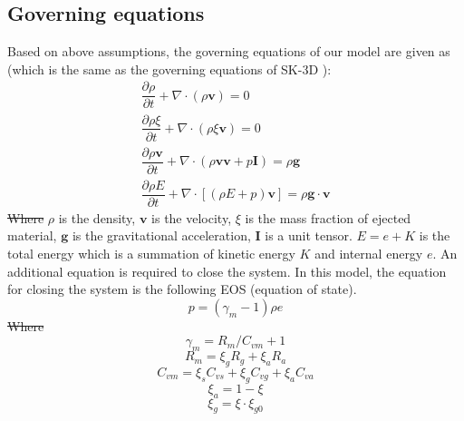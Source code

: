 \documentclass[gmd, manuscript]{copernicus} %
\providecommand{\DIFadd}[1]{{\protect\color{blue}\uwave{#1}}} %
\providecommand{\DIFdel}[1]{{\protect\color{red}\sout{#1}}}                      %
\providecommand{\DIFaddbegin}{} %
\providecommand{\DIFaddend}{} %
\providecommand{\DIFdelbegin}{} %
\providecommand{\DIFdelend}{} %
\begin{document}
\subsection{Governing equations}
Based on above assumptions, the governing equations of our model are given as (which is the same as the governing equations of SK-3D \citep{suzuki2005numerical}):
\begin{align}
\dfrac{\partial \rho}{\partial t} + \nabla \cdot \left(\rho \textbf{v}\right) = 0 \label{eq:gov-cs-rho} \\
\dfrac{\partial \rho \xi}{\partial t} + \nabla \cdot \left(\rho \xi \textbf{v}\right) = 0 \label{eq:gov-cs-ks}\\
\dfrac{\partial \rho \textbf{v}}{\partial t} + \nabla \cdot \left(\rho \textbf{v} \textbf{v} + p\textbf{I}\right) = \rho \textbf{g} \label{eq:gov-cs-v} \\
\dfrac{\partial \rho E}{\partial t} + \nabla \cdot \left[\left(\rho E + p \right)\textbf{v}\right] = \rho \textbf{g} \cdot\textbf{v} \label{eq:gov-cs-e}
\end{align}
\DIFdelbegin \DIFdel{Where }\DIFdelend \DIFaddbegin \DIFadd{where }\DIFaddend $\rho$ is the density, $\textbf{v}$ is the velocity, $\xi$ is the mass fraction of ejected material, $\textbf{g}$ is the gravitational acceleration, $\textbf{I}$ is a unit tensor.
$E = e + K $ is the total energy which is a summation of kinetic energy $K$ and internal energy $e$.
An additional equation is required to close the system. In this model, the equation for closing the system is the following EOS (equation of state).
\begin{equation}
p = \left(\gamma_m - 1\right)\rho e \label{eq:EOS}
\end{equation}
\DIFdelbegin \DIFdel{Where 
}\DIFdelend \DIFaddbegin \DIFadd{where 
}\DIFaddend \begin{equation}
\gamma_m = R_m/C_{vm} + 1 \label{eq:gov-gm}
\end{equation}
\begin{equation}
R_m = \xi_g R_g + \xi_a R_a  \label{eq:gov-Rm}
\end{equation}
\begin{equation}
C_{vm} = \xi_s C_{vs} + \xi_g C_{vg} + \xi_a C_{va} \label{eq:gov-Cvm}
\end{equation}
\begin{equation}
\xi_a = 1 - \xi \label{eq:gov-na}
\end{equation}
\begin{equation}
\xi_g = \xi \cdot \xi_{g0} \label{eq:gov-ng}
\end{equation}
\end{document}
